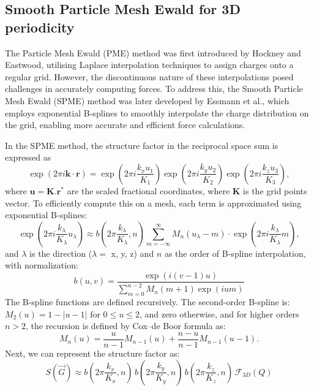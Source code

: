 \subsection{Smooth Particle Mesh Ewald for 3D periodicity}
The Particle Mesh Ewald (PME) method was first introduced by Hockney and Eastwood, utilising Laplace interpolation techniques to assign charges onto a regular grid. However, the discontinuous nature of these interpolations posed challenges in accurately computing forces. To address this, the Smooth Particle Mesh Ewald (SPME) method was later developed by Essmann et al., which employs exponential B-splines to smoothly interpolate the charge distribution on the grid, enabling more accurate and efficient force calculations.

In the SPME method, the structure factor in the reciprocal space sum is expressed as
\begin{equation}
\exp(2\pi i \mathbf{k} \cdot \mathbf{r}) =
\exp\left(2\pi i \frac{k_x u_1}{K_1} \right)
\exp\left(2\pi i \frac{k_y u_2}{K_2} \right)
\exp\left(2\pi i \frac{k_z u_3}{K_3} \right),
\end{equation}
where $\mathbf{u} = \mathbf{K}.\mathbf{r^*}$ are the scaled fractional coordinates, where $\mathbf{K}$ is the grid points vector.
To efficiently compute this on a mesh, each term is approximated using exponential B-splines:
\begin{equation}
    \exp\left(2\pi i \frac{k_\lambda}{K_\lambda} u_\lambda\right) \approx 
    b \left(2\pi \frac{k_\lambda}{K_\lambda},n\right) \sum_{m=-\infty}^{\infty} M_n(u_\lambda - m) 
    \cdot \exp\left(2\pi i \frac{k_\lambda}{K_\lambda} m\right),\label{eq:bspline}
\end{equation}
and $\lambda$ is the direction ($\lambda = $ x, y, z) and $n$ as the order of B-spline interpolation, with normalization:
\begin{equation}
    b(u,v) = \frac{\exp\left(i (v - 1) u\right)}
       {\sum_{m=0}^{n-2} M_n(m+1) \exp\left(i um\right)}
\end{equation}
The B-spline functions are defined recursively. The second-order B-spline is:
$M_2(u) = 
1 - |u - 1| \text{ for } 0 \le u \le 2$, and zero otherwise, and for higher orders \( n > 2 \), the recursion is defined by Cox–de Boor formula as:
\begin{equation}
M_n(u) = \frac{u}{n-1} M_{n-1}(u) + \frac{n - u}{n - 1} M_{n-1}(u - 1).
\end{equation}
Next, we can represent the structure factor as:
\begin{equation}
    S(\vec{G}) \approx b\left(2\pi \frac{k_x}{K_x},n\right)\,b\left(2\pi \frac{k_y}{K_y},n\right)\,b\left(2\pi \frac{k_z}{K_z},n\right) \, \mathcal{F}_{3D}(Q)
\end{equation}
